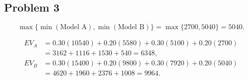 \subsection*{Problem 3}
\[\max\{\min(\text{Model A}), \min(\text{Model B})\}
		= \max\{2700, 5040\}
		= 5040.\]

\[\begin{aligned}
		EV_A &= 0.30(10540)+0.20(5580)+0.30(5100)+0.20(2700)\\
		&= 3162+1116+1530+540=6348,\\
		EV_B &= 0.30(15400)+0.20(9800)+0.30(7920)+0.20(5040)\\
		&= 4620+1960+2376+1008=9964.
		\end{aligned}\]


